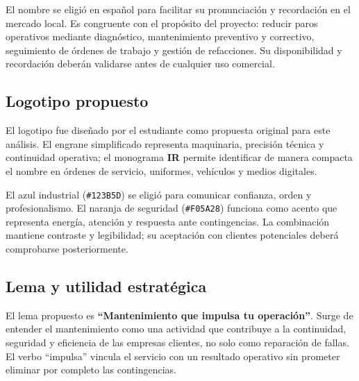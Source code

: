 {El nombre se eligió en español para facilitar su pronunciación y recordación en el mercado local. Es congruente con el propósito del proyecto: reducir paros operativos mediante diagnóstico, mantenimiento preventivo y correctivo, seguimiento de órdenes de trabajo y gestión de refacciones. Su disponibilidad y recordación deberán validarse antes de cualquier uso comercial.

\subsection{Logotipo propuesto}

\begin{center}
\end{center}

El logotipo fue diseñado por el estudiante como propuesta original para este análisis. El engrane simplificado representa maquinaria, precisión técnica y continuidad operativa; el monograma \textbf{IR} permite identificar de manera compacta el nombre en órdenes de servicio, uniformes, vehículos y medios digitales.

El azul industrial (\texttt{\#123B5D}) se eligió para comunicar confianza, orden y profesionalismo. El naranja de seguridad (\texttt{\#F05A28}) funciona como acento que representa energía, atención y respuesta ante contingencias. La combinación mantiene contraste y legibilidad; su aceptación con clientes potenciales deberá comprobarse posteriormente.

\subsection{Lema y utilidad estratégica}

El lema propuesto es \textbf{``Mantenimiento que impulsa tu operación''}. Surge de entender el mantenimiento como una actividad que contribuye a la continuidad, seguridad y eficiencia de las empresas clientes, no solo como reparación de fallas. El verbo ``impulsa'' vincula el servicio con un resultado operativo sin prometer eliminar por completo las contingencias.

}

